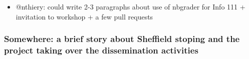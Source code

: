 \documentclass{deliverablereport}
\begin{document}
\begin{itemize}
\tightlist
\item
  @nthiery: could write 2-3 paragraphs about use of nbgrader for Info
  111 + invitation to workshop + a few pull requests
\end{itemize}

\hypertarget{somewhere-a-brief-story-about-sheffield-stoping-and-the-project-taking-over-the-dissemination-activities}{%
\subsubsection{Somewhere: a brief story about Sheffield stoping and the
project taking over the dissemination
activities}\label{somewhere-a-brief-story-about-sheffield-stoping-and-the-project-taking-over-the-dissemination-activities}}
\end{document}
